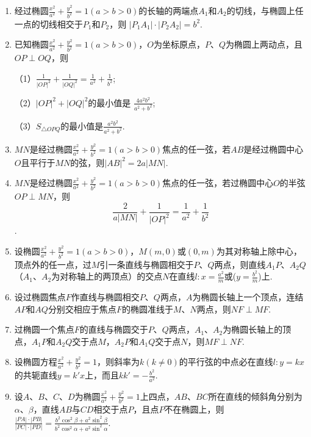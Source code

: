 \documentclass{article}
\begin{document}
\begin{enumerate}[label=\arabic*.]
\item 经过椭圆$\frac{x^2}{a^2} + \frac{y^2}{b^2} = 1 \left(a > b > 0\right)$的长轴的两端点$A_1$和$A_2$的切线，与椭圆上任一点的切线相交于$P_1$和$P_2$，则
$\left|P_1A_1 \right|\cdot\left|P_2A_2 \right|=b^2$. 

\item 已知椭圆$\frac{x^2}{a^2} + \frac{y^2}{b^2} = 1 \left(a > b > 0\right)$，$O$为坐标原点，$P$、$Q$为椭圆上两动点，且$OP\perp OQ$，则

（1）$\frac{1}{\left|OP \right|^2}+\frac{1}{\left|OQ \right|^2}=\frac{1}{a^2}+\frac{1}{b^2}$;

（2）$\left| OP\right|^2 + \left| OQ\right|^2 $的最小值是
$\frac{4a^2b^2}{a^2+b^2}$; 

（3）$S_{\triangle OPQ}$的最小值是$\frac{a^2b^2}{a^2+b^2}$. 

\item $MN$是经过椭圆$\frac{x^2}{a^2} + \frac{y^2}{b^2} = 1 \left(a > b > 0\right)$焦点的任一弦，若$AB$是经过椭圆中心$O$且平行于$MN$的弦，则$\left|AB\right|^2=2a\left|MN\right|$. 

\item $MN$是经过椭圆$\frac{x^2}{a^2} + \frac{y^2}{b^2} = 1 \left(a > b > 0\right)$焦点的任一弦，若过椭圆中心$O$的半弦$OP \perp MN$，则$$\frac{2}{a\left|MN\right|}+\frac{1}{\left|OP\right|^2} = \frac{1}{a^2} + \frac{1}{b^2}$$. 

\item 设椭圆$\frac{x^2}{a^2} + \frac{y^2}{b^2} = 1 \left(a > b > 0\right)$，$M\left(m,0\right)$或$\left(0,m\right)$为其对称轴上除中心，顶点外的任一点，过$M$引一条直线与椭圆相交于$P$、$Q$两点，则直线$A_1P$、$A_2Q$（$A_1$、$A_2$为对称轴上的两顶点）的交点$N$在直线$l:x=\frac{a^2}{m}$或($y=\frac{b^2}{m}$)上. 

\item 设过椭圆焦点$F$作直线与椭圆相交$P$、$Q$两点，$A$为椭圆长轴上一个顶点，连结$AP$和$AQ$分别交相应于焦点$F$的椭圆准线于$M$、$N$两点，则$NF\perp MF$. 

\item 过椭圆一个焦点$F$的直线与椭圆交于$P$、$Q$两点，$A_1$、$A_2$为椭圆长轴上的顶点，$A_1P$和$A_2Q$交于点$M$，$A_2P$和$A_1Q$交于点$N$，则$MF \perp NF$. 

\item 设椭圆方程$\frac{x^2}{a^2} + \frac{y^2}{b^2} = 1$，则斜率为$k\left(k\neq 0\right)$的平行弦的中点必在直线$l:y=kx$的共轭直线$y=k'x$上，而且$kk'=-\frac{b^2}{a^2}$. 

\item 设$A$、$B$、$C$、$D$为椭圆$\frac{x^2}{a^2} + \frac{y^2}{b^2} = 1$上四点，$AB$、$BC$所在直线的倾斜角分别为$\alpha$、$\beta$，直线$AB$与$CD$相交于点$P$，且点$P$不在椭圆上，则$\frac{\left|PA\right|\cdot\left|PB\right|}{\left|PC\right|\cdot\left|PD\right|} = \frac{b^2\cos^2\beta+a^2\sin^2\beta}{b^2\cos^2\alpha+a^2\sin^2\alpha}$. 


\end{enumerate}
\end{document}

